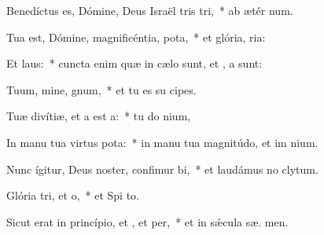 \item Benedíctus es, Dómine, Deus Israël tris tri,~* ab ætér  num.
\item Tua est, Dómine, magnificéntia,  pota,~* et glória,  ria:
\item Et  laus:~* cuncta enim quæ in cælo sunt, et  , a sunt:
\item Tuum, mine, gnum,~* et tu es su  cipes.
\item Tuæ divítiæ, et a est a:~* tu do nium,
\item In manu tua virtus  pota:~* in manu tua magnitúdo, et im nium.
\item Nunc ígitur, Deus noster, confimur bi,~* et laudámus no  clytum.
\item Glória tri, et o,~* et Spi to.
\item Sicut erat in princípio, et , et per,~* et in sǽcula sæ. men.
